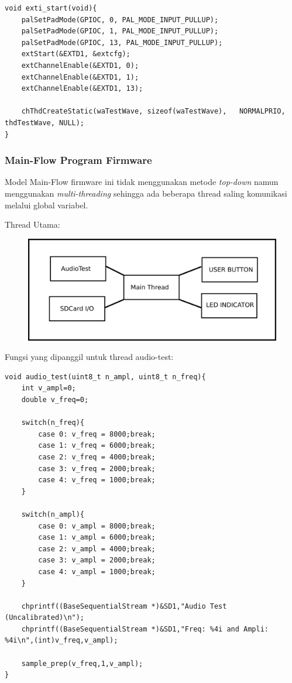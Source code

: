 \documentclass[12pt,]{article}
\begin{document}
\begin{verbatim}
void exti_start(void){
	palSetPadMode(GPIOC, 0, PAL_MODE_INPUT_PULLUP);
	palSetPadMode(GPIOC, 1, PAL_MODE_INPUT_PULLUP);
	palSetPadMode(GPIOC, 13, PAL_MODE_INPUT_PULLUP);
	extStart(&EXTD1, &extcfg);
	extChannelEnable(&EXTD1, 0);
	extChannelEnable(&EXTD1, 1);
	extChannelEnable(&EXTD1, 13);
	
	chThdCreateStatic(waTestWave, sizeof(waTestWave),	NORMALPRIO, thdTestWave, NULL);
}
	\end{verbatim}

	\subsubsection{Main-Flow Program Firmware}
	Model Main-Flow firmware ini tidak menggunakan metode \textit{top-down} namun menggunakan \textit{multi-threading}
	sehingga ada beberapa thread saling komunikasi melalui global variabel.

	Thread Utama:
	\begin{figure}[!ht]
		\centering
		\includegraphics[width=400pt]{images/thread}
	\end{figure}

	Fungsi yang dipanggil untuk thread audio-test:
	\begin{verbatim}
void audio_test(uint8_t n_ampl, uint8_t n_freq){
	int v_ampl=0;
	double v_freq=0;
	
	switch(n_freq){
		case 0: v_freq = 8000;break;
		case 1: v_freq = 6000;break;
		case 2: v_freq = 4000;break;
		case 3: v_freq = 2000;break;
		case 4: v_freq = 1000;break;
	}
	
	switch(n_ampl){
		case 0: v_ampl = 8000;break;
		case 1: v_ampl = 6000;break;
		case 2: v_ampl = 4000;break;
		case 3: v_ampl = 2000;break;
		case 4: v_ampl = 1000;break;
	}
	
	chprintf((BaseSequentialStream *)&SD1,"Audio Test (Uncalibrated)\n");
	chprintf((BaseSequentialStream *)&SD1,"Freq: %4i and Ampli: %4i\n",(int)v_freq,v_ampl);
	
	sample_prep(v_freq,1,v_ampl);
}
	\end{verbatim}
	
\end{document}
